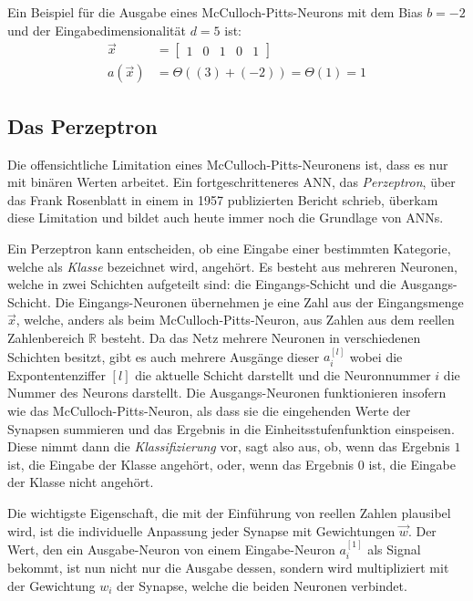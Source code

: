 \documentclass[12pt,titlepage]{article}
\begin{document}
Ein Beispiel für die Ausgabe eines McCulloch-Pitts-Neurons mit dem Bias $b = -2$ und der Eingabedimensionalität $d = 5$ ist:
\begin{align*}
  \vec{x}    & = \begin{bmatrix}
                   1 & 0 & 1 & 0 & 1
                 \end{bmatrix}                      \\
  a(\vec{x}) & = \Theta (( 3 ) + (-2)) = \Theta (1) = 1
\end{align*}

\subsection{Das Perzeptron} \label{sec:perzeptron}

Die offensichtliche Limitation eines McCulloch-Pitts-Neuronens ist, dass es nur mit binären Werten arbeitet. Ein fortgeschritteneres ANN, das \textit{Perzeptron}, über das Frank Rosenblatt in einem in 1957 publizierten Bericht \autocite{rosenblatt1957perceptron} schrieb, überkam diese Limitation und bildet auch heute immer noch die Grundlage von ANNs.

Ein Perzeptron kann entscheiden, ob eine Eingabe einer bestimmten Kategorie, welche als \textit{Klasse} bezeichnet wird, angehört. Es besteht aus mehreren Neuronen, welche in zwei Schichten aufgeteilt sind: die Eingangs-Schicht und die Ausgangs-Schicht. Die Eingangs-Neuronen übernehmen je eine Zahl aus der Eingangsmenge \(\vec{x}\), welche, anders als beim McCulloch-Pitts-Neuron, aus Zahlen aus dem reellen Zahlenbereich \(\mathbb{R}\) besteht. Da das Netz mehrere Neuronen in verschiedenen Schichten besitzt, gibt es auch mehrere Ausgänge dieser \(a^{[l]}_i\) wobei die Expontentenziffer \([l]\) die aktuelle Schicht darstellt und die Neuronnummer \(i\) die Nummer des Neurons darstellt. Die Ausgangs-Neuronen funktionieren insofern wie das McCulloch-Pitts-Neuron, als dass sie die eingehenden Werte der Synapsen summieren und das Ergebnis in die Einheitsstufenfunktion einspeisen. Diese nimmt dann die \textit{Klassifizierung} vor, sagt also aus, ob, wenn das Ergebnis $1$ ist, die Eingabe der Klasse angehört, oder, wenn das Ergebnis $0$ ist, die Eingabe der Klasse nicht angehört.

Die wichtigste Eigenschaft, die mit der Einführung von reellen Zahlen plausibel wird, ist die individuelle Anpassung jeder Synapse mit Gewichtungen $\vec{w}$. Der Wert, den ein Ausgabe-Neuron von einem Eingabe-Neuron \(a^{[1]}_i\) als Signal bekommt, ist nun nicht nur die Ausgabe dessen, sondern wird multipliziert mit der Gewichtung $w_i$ der Synapse, welche die beiden Neuronen verbindet.
\end{document}
